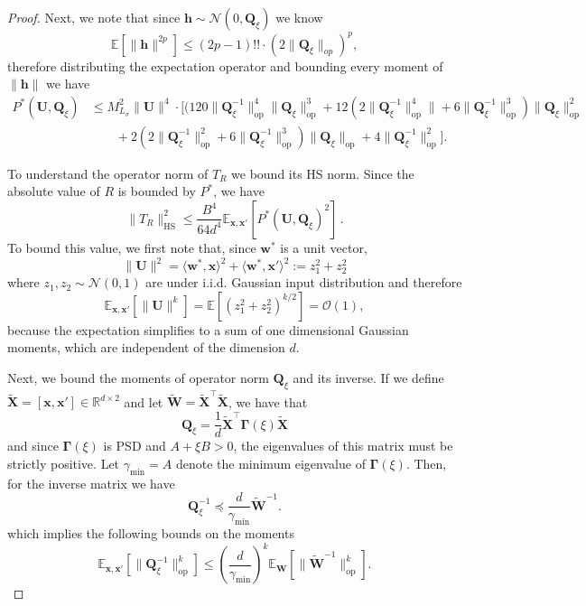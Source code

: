 \begin{proof}
    Next, we note that since $\bm h \sim \mathcal N(0, \bm Q_{\xi})$ we know
    \[
        \mathbb{E}[\|\bm{h}\|^{2p}] \leq (2p-1)!! \cdot (2\|\bm Q_\xi\|_{op})^p,
    \]
    therefore distributing the expectation operator and bounding every moment of $\|\bm h\|$ we have
    \begin{align}\label{eq:K'-bound}
        P^*(\bm U, \bm Q_{\xi}) &\leq M_{L_{\sigma}}^2 \|\bm U\|^4 \cdot \Big[ (120 \|\bm Q_\xi^{-1}\|_{\text{op}}^4\|\bm Q_\xi\|_{\text{op}}^3 + 12(2\|\bm Q_\xi^{-1}\|_{\text{op}}^4\| + 6\|\bm Q_\xi^{-1}\|_{\text{op}}^3)\|\bm Q_\xi\|_{\text{op}}^2 \nonumber \\
        &\qquad + 2(2\|\bm Q_\xi^{-1}\|_{\text{op}}^2 + 6\|\bm Q_\xi^{-1}\|_{\text{op}}^3)\|\bm Q_\xi\|_{\text{op}} +4\|\bm Q_\xi^{-1}\|_{\text{op}}^2 \Big].
    \end{align}

    To understand the operator norm of $T_R$ we bound its HS norm. Since the absolute value of $R$ is bounded by $P^*$, we have
    \[
        \|T_R\|^2_{\text{HS}} \leq \frac{B^4}{64d^4}\mathbb E_{\bm x, \bm x'}[P^*(\bm U, \bm Q_{\xi})^2] \, .
    \]
    To bound this value, we first note that, since $\bm w^*$ is a unit vector,
    \[
        \|\bm U\|^{2} = \langle \bm w^*, \bm x\rangle^2 + \langle \bm w^*, \bm x'\rangle^2 := z_1^2 + z_2^2
    \]
    where $z_1, z_2 \sim \mathcal N(0, 1)$ are under i.i.d. Gaussian input distribution and therefore
    \[
        \mathbb E_{\bm x, \bm x'}[\|\bm U\|^k] = \mathbb E[(z_1^2 + z_2^2)^{k/2}] = \mathcal O(1),
    \]
    because the expectation simplifies to a sum of one dimensional Gaussian moments, which are independent of the dimension $d$.
    
    Next, we bound the moments of operator norm $\bm Q_{\xi}$ and its inverse. If we define $\tilde {\bm X} = [\bm x, \bm x'] \in \mathbb R^{d \times 2}$ and let $\tilde {\bm W} = \tilde {\bm X}^\top \tilde {\bm X}$, we have that
    \[
        \bm Q_\xi = \frac{1}{d}\tilde{\bm X}^\top \bm \Gamma(\xi) \tilde{\bm X}
    \]
    and since $\bm \Gamma(\xi)$ is PSD and $A + \xi B > 0$, the eigenvalues of this matrix must be strictly positive. Let $\gamma_{\min} = A$ denote the minimum eigenvalue of $\bm \Gamma(\xi)$. Then, for the inverse matrix we have
    \[
        \bm Q_{\xi}^{-1} \preceq \frac{d}{\gamma_{\min}} \tilde{\bm W}^{-1}.
    \]
    which implies the following bounds on the moments
    \[
        \mathbb{E}_{\bm x, \bm x'} \left[ \|\bm Q_\xi^{-1}\|_{\text{op}}^k \right] \le \left(\frac{d}{\gamma_{\min}}\right)^k \mathbb{E}_{\bm W} \left[ \|\tilde{\bm W}^{-1}\|_{\text{op}}^k \right].
    \]


\end{proof}
